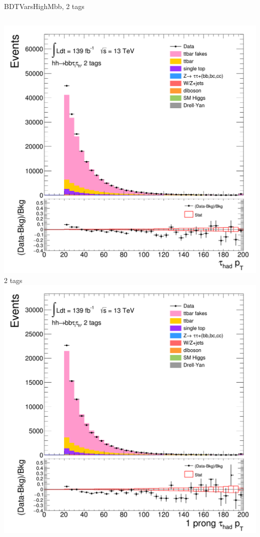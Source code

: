 \begin{frame}{BDTVarsHighMbb, 2 tags}
  \begin{columns}[c]
    \centering\includegraphics[width=\textwidth]{C_2tag2pjet_0ptv_TauPt}\\
    2 tags
    \centering\includegraphics[width=\textwidth]{C_2tag2pjet_0ptv_TauPt1P}\\

\end{columns}
\end{frame}

